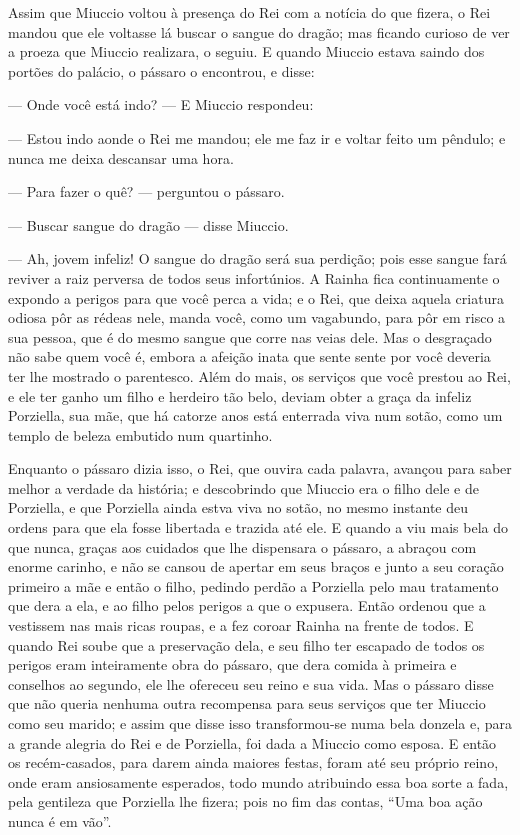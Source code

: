 Assim que Miuccio voltou à presença do Rei com a notícia do que
fizera, o Rei mandou que ele voltasse lá buscar o sangue do dragão;
mas ficando curioso de ver a proeza que Miuccio realizara, o seguiu.
E quando Miuccio estava saindo dos portões do palácio, o pássaro o
encontrou, e disse:

— Onde você está indo? — E Miuccio respondeu:

— Estou indo aonde o Rei me mandou; ele me faz ir e voltar feito um
pêndulo; e nunca me deixa descansar uma hora.

— Para fazer o quê? — perguntou o pássaro.

— Buscar sangue do dragão — disse Miuccio.

— Ah, jovem infeliz! O sangue do dragão será sua perdição; pois esse
sangue fará reviver a raiz perversa de todos seus infortúnios. A
Rainha fica continuamente o expondo a perigos para que você perca a
vida; e o Rei, que deixa aquela criatura odiosa pôr as rédeas nele,
manda você, como um vagabundo, para pôr em risco a sua pessoa, que é
do mesmo sangue que corre nas veias dele. Mas o desgraçado não sabe
quem você é, embora a afeição inata que sente sente por você deveria
ter lhe mostrado o parentesco. Além do mais, os serviços que você
prestou ao Rei, e ele ter ganho um filho e herdeiro tão belo, deviam
obter a graça da infeliz Porziella, sua mãe, que há catorze anos está
enterrada viva num sotão, como um templo de beleza embutido num
quartinho.

Enquanto o pássaro dizia isso, o Rei, que ouvira cada palavra, avançou
para saber melhor a verdade da história; e descobrindo que Miuccio
era o filho dele e de Porziella, e que Porziella ainda estva viva no
sotão, no mesmo instante deu ordens para que ela fosse libertada e
trazida até ele. E quando a viu mais bela do que nunca, graças aos
cuidados que lhe dispensara o pássaro, a abraçou com enorme carinho,
e não se cansou de apertar em seus braços e junto a seu coração
primeiro a mãe e então o filho, pedindo perdão a Porziella pelo mau
tratamento que dera a ela, e ao filho pelos perigos a que o expusera.
Então ordenou que a vestissem nas mais ricas roupas, e a fez coroar
Rainha na frente de todos. E quando Rei soube que a preservação dela,
e seu filho ter escapado de todos os perigos eram inteiramente obra
do pássaro, que dera comida à primeira e conselhos ao segundo, ele
lhe ofereceu seu reino e sua vida. Mas o pássaro disse que não queria
nenhuma outra recompensa para seus serviços que ter Miuccio como seu
marido; e assim que disse isso transformou-se numa bela donzela e,
para a grande alegria do Rei e de Porziella, foi dada a Miuccio como
esposa. E então os recém-casados, para darem ainda maiores festas,
foram até seu próprio reino, onde eram ansiosamente esperados, todo
mundo atribuindo essa boa sorte a fada, pela gentileza que Porziella
lhe fizera; pois no fim das contas, “Uma boa ação nunca é em vão”.

